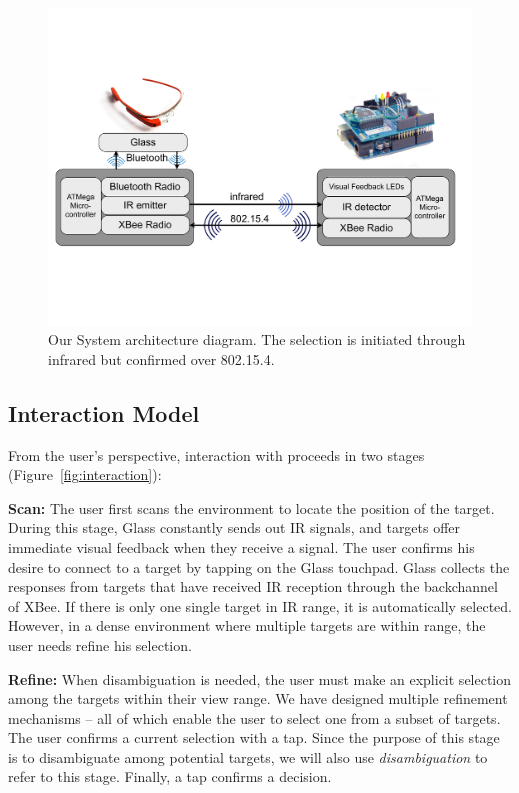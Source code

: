 \begin{figure}[t]
\centering
\includegraphics[width=1\columnwidth]{figures/architecture_new}
\caption{Our System architecture diagram. The selection is initiated through infrared but confirmed over 802.15.4.}
\label{fig:architecture}
\end{figure}



\subsection{Interaction Model}
From the user's perspective, interaction with \systemname proceeds in two stages (Figure~\ref{fig:interaction}): 


{\bf Scan:} The user first scans the environment to locate the position of the target. During this stage, Glass constantly sends out IR signals, and  targets offer immediate visual feedback when they receive a signal. The user confirms his desire to connect to a target by tapping on the Glass touchpad. Glass collects the responses from targets that have received IR reception through the backchannel of XBee. If there is only one single target in IR range, it is automatically selected. However, in a dense environment where multiple targets are within range, the user needs refine his selection.


{\bf Refine:} When disambiguation is needed, the user must make an explicit selection among the targets within their view range. We have designed multiple refinement mechanisms -- all of which enable the user to select one from a subset of targets. The user confirms a current selection with a tap. Since the purpose of this stage is to disambiguate among potential targets, we will also use {\em disambiguation} to refer to this stage. Finally, a tap confirms a decision.


